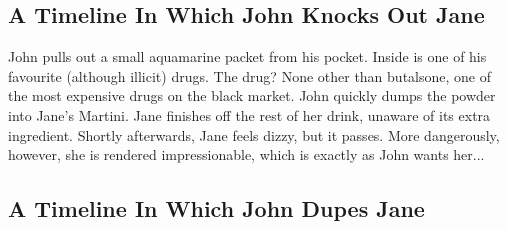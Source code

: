 \documentclass{article}
\begin{document}
\subsection{A Timeline In Which John Knocks Out Jane}


John pulls out a small aquamarine packet from his pocket. Inside is one of his favourite (although illicit) drugs.
The drug? None other than butalsone, one of the most expensive drugs on the black market.
John quickly dumps the powder into Jane's Martini.
Jane finishes off the rest of her drink, unaware of its extra ingredient.
Shortly afterwards, Jane feels dizzy, but it passes.
More dangerously, however, she is rendered impressionable, which is exactly as John wants her...
\subsection{A Timeline In Which John Dupes Jane}
\end{document}
